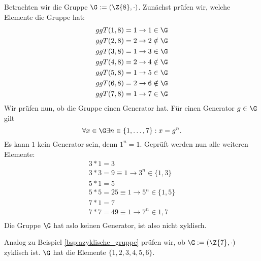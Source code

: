 \begin{beispiel}
\label{bsp:azyklische_gruppe}
Betrachten wir die Gruppe $\G := (\Z{8}, \cdot)$. Zunächst prüfen wir, welche
Elemente die Gruppe hat:
\begin{eqnarray*}
ggT(1, 8) = 1 \rightarrow 1 \in \G\\
ggT(2, 8) = 2 \rightarrow 2 \notin \G\\
ggT(3, 8) = 1 \rightarrow 3 \in \G\\
ggT(4, 8) = 2 \rightarrow 4 \notin \G\\
ggT(5, 8) = 1 \rightarrow 5 \in \G\\
ggT(6, 8) = 2 \rightarrow 6 \notin \G\\
ggT(7, 8) = 1 \rightarrow 7 \in \G\\
\end{eqnarray*}
Wir prüfen nun, ob die Gruppe einen Generator hat. Für einen Generator
$g \in \G$ gilt 
\[
\forall x \in \G \exists n\in\{1,\dots, 7\}: x = g^n.
\]
Es kann $1$ kein Generator sein, denn $1^n=1$. Geprüft werden nun alle
weiteren Elemente:
\begin{eqnarray*}
  3*1 = 3\\
  3*3 = 9 \equiv 1 \rightarrow 3^n\in\{1, 3\}\\
  5*1 = 5\\
  5*5 = 25 \equiv 1 \rightarrow 5^n\in\{1, 5\}\\
  7*1 = 7\\
  7*7 = 49 \equiv 1 \rightarrow 7^n\in{1, 7}\\
\end{eqnarray*}
Die Gruppe $\G$ hat aslo keinen Generator, ist also nicht zyklisch.
\end{beispiel}

\begin{beispiel}
  Analog zu Beispiel \ref{bsp:azyklische_gruppe} prüfen wir, ob $\G :=
  (\Z{7}, \cdot)$ zyklisch ist. $\G$ hat die Elemente $\{1, 2, 3, 4, 5,
  6\}$. 
\end{beispiel}